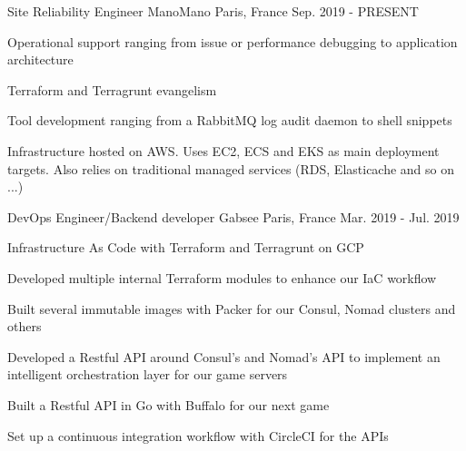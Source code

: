 

\begin{cventries}

  \cventry
    {Site Reliability Engineer} %
    {ManoMano} %
    {Paris, France} %
    {Sep. 2019 - PRESENT} %
    {
      \begin{cvitems} %
        \item {Operational support ranging from issue or performance debugging to application architecture}
        \item {Terraform and Terragrunt evangelism}
        \item {Tool development ranging from a RabbitMQ log audit daemon to shell snippets}
        \item {Infrastructure hosted on AWS. Uses EC2, ECS and EKS as main deployment targets. Also relies on traditional managed services (RDS, Elasticache and so on ...)}
      \end{cvitems}
    }

  \cventry
    {DevOps Engineer/Backend developer} %
    {Gabsee} %
    {Paris, France} %
    {Mar. 2019 - Jul. 2019} %
    {
      \begin{cvitems} %
        \item {Infrastructure As Code with Terraform and Terragrunt on GCP}
        \item {Developed multiple internal Terraform  modules to enhance our IaC workflow}
        \item {Built several immutable images with Packer for our Consul, Nomad clusters and others}
        \item {Developed a Restful API around Consul's and Nomad's API to implement an intelligent orchestration layer for our game servers}
        \item {Built a Restful API in Go with Buffalo for our next game}
        \item {Set up a continuous integration workflow with CircleCI for the APIs}
      \end{cvitems}
    }


\end{cventries}
